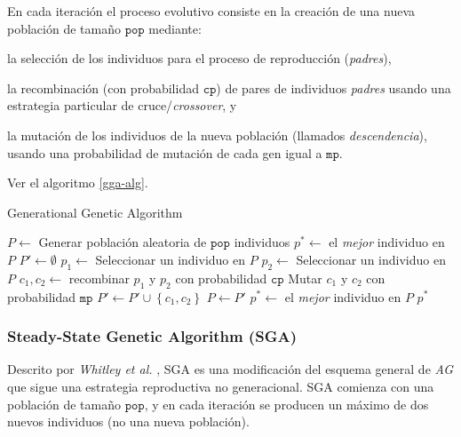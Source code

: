 En cada iteración el proceso evolutivo consiste en la creación de una nueva población de tamaño $\texttt{pop}$ mediante:
\begin{inparaenum}
\item la selección de los individuos para el proceso de reproducción (\emph{padres}),
\item la recombinación (con probabilidad $\texttt{cp}$) de pares de individuos \emph{padres} usando una estrategia particular de cruce/\emph{crossover}, y
\item la mutación de los individuos de la nueva población (llamados \emph{descendencia}), usando una probabilidad de mutación de cada gen igual a $\texttt{mp}$.
\end{inparaenum}
Ver el algoritmo \ref{gga-alg}.

\begin{algorithm}
\caption{Generational Genetic Algorithm}
\label{gga-alg}
\begin{algorithmic}[1]


\State $P \gets$ Generar población aleatoria de $\texttt{pop}$ individuos
\State $p^{*} \gets $ el \emph{mejor} individuo en $P$
	\State $P' \gets \emptyset$
		\State $p_1 \gets$ Seleccionar un individuo en $P$
		\State $p_2 \gets$ Seleccionar un individuo en $P$
		\State $c_1, c_2 \gets $ recombinar $p_1$ y $p_2$ con probabilidad $\texttt{cp}$
		\State Mutar $c_1$ y $c_2$ con probabilidad $\texttt{mp}$
		\State $P' \gets P' \cup \left\lbrace c_1, c_2 \right\rbrace$
	\EndWhile
	\State $P \gets P'$
		\State $p^{*} \gets$ el \emph{mejor} individuo en $P$
	\EndIf
\EndWhile
\State \Return $p^{*}$

\end{algorithmic}
\end{algorithm}

\subsubsection{Steady-State Genetic Algorithm (SGA)}

Descrito por \emph{Whitley et al.} \cite{whitley1988genitor}, SGA es una modificación del esquema general de \emph{AG} que sigue una estrategia reproductiva no generacional. SGA comienza con una población de tamaño $\texttt{pop}$, y en cada iteración se producen un máximo de dos nuevos individuos (no una nueva población).

